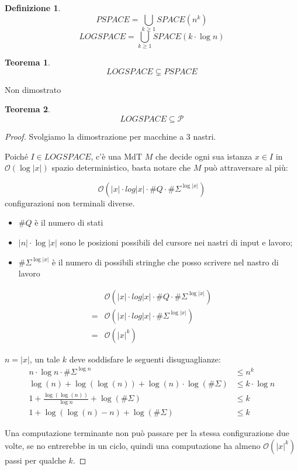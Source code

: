 \documentclass[a4paper,10pt,oneside]{article}
\theoremstyle{break}
\newtheorem{deff}{Definizione}[section]
\newtheorem{teo}{Teorema}[subsection]
\newcommand{\bigo}{\mathcal O}
\begin{document}
\begin{deff}
 \[PSPACE = \bigcup_{k \geq 1} SPACE(n^k)\]
 \[LOGSPACE = \bigcup_{k \geq 1} SPACE(k\cdot \log n)\]
\end{deff}
\begin{mdframed}
\begin{teo}
\[ LOGSPACE \subsetneq PSPACE \]
\end{teo}
Non dimostrato
\end{mdframed}
\newpage
\begin{mdframed}
\begin{teo}
\[ LOGSPACE \subseteq \mathcal P\]
\end{teo}

\dotfill

\begin{proof} Svolgiamo la dimostrazione per macchine a 3 nastri.\smallskip

 Poiché $I \in LOGSPACE$, c'è una MdT $M$ che decide ogni sua istanza $x \in I$ in $\bigo (\log |x|)$ spazio deterministico, basta notare che $M$ può attraversare al più:

 \[ \bigo (|x| \cdot log |x| \cdot \#Q \cdot \# \Sigma^{\log|x|}) \]
 configurazioni non terminali diverse.\smallskip
\begin{itemize}
 \item $\#Q$ è il numero di stati
 \item $|n|\cdot\log|x|$ sono le posizioni possibili del cursore nei nastri di input e lavoro;
 \item $\#\Sigma^{\log |x|}$ è il numero di possibili stringhe che posso scrivere nel nastro di lavoro

\end{itemize}

 \[\begin{aligned}
& \bigo (|x| \cdot log |x| \cdot \#Q \cdot \# \Sigma^{\log|x|}) \\
= & \bigo (|x| \cdot log |x| \cdot \# \Sigma^{\log|x|})\\
= & \bigo (|x|^k)
  \end{aligned}\]

$n = |x|$, un tale $k$ deve soddisfare le seguenti disuguaglianze:
 \[\begin{aligned}
  n \cdot \log n \cdot \#\Sigma^{\log n} &\leq n^k\\[10pt]
  \log(n) + \log(\log(n)) + \log(n)\cdot \log(\#\Sigma) &\leq k \cdot \log n\\[10pt]
  1 + \frac{\log(\log(n))}{\log n} + \log(\#\Sigma) &\leq k\\[10pt]
  1 + \log(\log(n) - n) + \log(\#\Sigma) &\leq k
  \end{aligned}\]

 Una computazione terminante non può passare per la stessa configurazione due volte, se no entrerebbe in un ciclo, quindi una computazione ha almeno $\bigo(|x|^k)$ passi per qualche $k$.
\end{proof}
\end{mdframed}
\newpage
\end{document}
